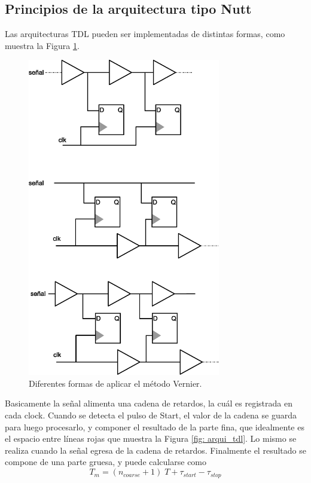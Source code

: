 \subsection{Principios de la arquitectura tipo Nutt}
Las arquitecturas TDL pueden ser implementadas de distintas formas, como muestra la Figura \ref{fig: various_tdl}.
\begin{figure}[H]
     \centering
     \includegraphics[width=0.75\textwidth]{imagenes/various_tdl.eps}
     \caption{Diferentes formas de aplicar el método Vernier.}
     \label{fig: various_tdl}
\end{figure}

Basicamente la señal alimenta una cadena de retardos, la cuál es registrada en cada clock. Cuando
se detecta el pulso de Start, el valor de la cadena se guarda para luego procesarlo, y componer el
resultado de la parte fina, que idealmente es el espacio entre líneas rojas que muestra la Figura \ref{fig: arqui_tdl}. 
Lo mismo se realiza cuando la señal egresa de la cadena de retardos. Finalmente el resultado se compone
de una parte gruesa, y puede calcularse como
\begin{equation*}
     T_{m} = (n_{coarse}+1) \; T + \tau_{start} - \tau_{stop} 
\end{equation*}


